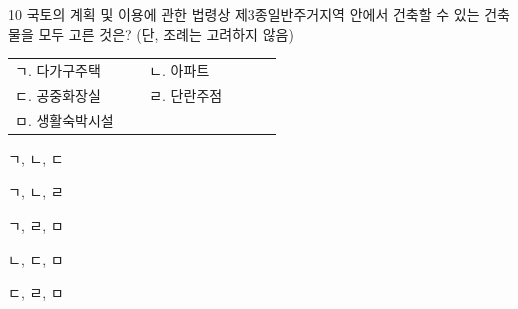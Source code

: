 \begin{question}{10}
국토의 계획 및 이용에 관한 법령상 제3종일반주거지역 안에서 건축할 수 있는 건축물을 모두 고른 것은? (단, 조례는 고려하지 않음)
\begin{framedtext}
\noindent\begin{tabular}{@{}p{0.42\linewidth}p{0.42\linewidth}@{}}
ㄱ. 다가구주택 & ㄴ. 아파트 \\
ㄷ. 공중화장실 & ㄹ. 단란주점 \\
ㅁ. 생활숙박시설 & \\
\end{tabular}
\end{framedtext}
\begin{choices}
  \item ㄱ, ㄴ, ㄷ
  \item ㄱ, ㄴ, ㄹ
  \item ㄱ, ㄹ, ㅁ
  \item ㄴ, ㄷ, ㅁ
  \item ㄷ, ㄹ, ㅁ
\end{choices}
\end{question}
